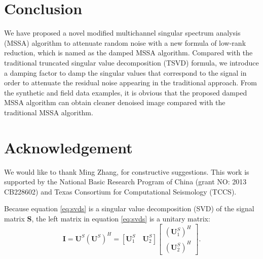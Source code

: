 

\section{Conclusion}
We have proposed a novel modified multichannel singular spectrum analysis (MSSA) algorithm to attenuate random noise with a new formula of low-rank reduction, which is named as the damped MSSA algorithm. Compared with the traditional truncated singular value decomposition (TSVD) formula, we introduce a damping factor to damp the singular values that correspond to the signal in order to attenuate the residual noise appearing in the traditional approach. %
  From the synthetic and field data examples, it is obvious that the proposed damped MSSA algorithm can obtain cleaner denoised image  compared with the traditional MSSA algorithm.

\section{Acknowledgement}
We would like to thank Ming Zhang,  for constructive suggestions. This work is supported by the National Basic Research Program of China (grant NO: 2013 CB228602) and Texas Consortium for Computational Seismology (TCCS). 

\newpage
{}
Because equation \ref{eq:svds} is a singular value decomposition (SVD) of the signal matrix $\mathbf{S}$, the left matrix in equation \ref{eq:svds} is a unitary matrix:
\begin{equation}
\label{eq:unit}
\mathbf{I}=\mathbf{U}^S(\mathbf{U}^S)^H=[\mathbf{U}_1^S\quad \mathbf{U}_2^S]\left[\begin{array}{c} 
(\mathbf{U}_1^S)^H \\
(\mathbf{U}_2^S)^H 
\end{array}
\right].
\end{equation}

